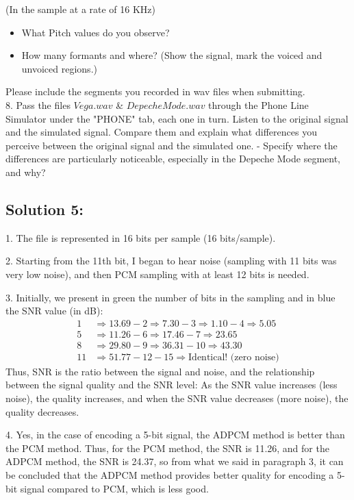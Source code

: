 \documentclass[letterpaper, 12pt]{article}
\begin{document}
   (In the sample at a rate of 16 KHz)\\
   \begin{itemize}
     \item What Pitch values do you observe? \\
     \item How many formants and where? (Show the signal, mark the voiced and unvoiced regions.)
   \end{itemize}
   Please include the segments you recorded in wav files when submitting.\\
8. Pass the files $Vega.wav$ \& $Depeche Mode.wav$ through the Phone Line Simulator under the "PHONE" tab, each one in turn. Listen to the original signal and the simulated signal. Compare them and explain what differences you perceive between the original signal and the simulated one.
   - Specify where the differences are particularly noticeable, especially in the Depeche Mode segment, and why?
\newpage

\subsection*{Solution 5:}
1. The file is represented in 16 bits per sample (16 bits/sample).

2. Starting from the 11th bit, I began to hear noise (sampling with 11 bits was very low noise), and then PCM sampling with at least 12 bits is needed.

3. Initially, we present in green the number of bits in the sampling and in blue the SNR value (in dB):
\begin{align*}
1 &\Rightarrow 13.69 - 2 \Rightarrow 7.30 - 3 \Rightarrow 1.10 - 4 \Rightarrow 5.05 \\
5 &\Rightarrow 11.26 - 6 \Rightarrow 17.46 - 7 \Rightarrow 23.65 \\
8 &\Rightarrow 29.80 - 9 \Rightarrow 36.31 - 10 \Rightarrow 43.30 \\
11 &\Rightarrow 51.77 - 12-15 \Rightarrow \text{Identical! (zero noise)}
\end{align*}
Thus, SNR is the ratio between the signal and noise, and the relationship between the signal quality and the SNR level:
As the SNR value increases (less noise), the quality increases, and when the SNR value decreases (more noise), the quality decreases.

4. Yes, in the case of encoding a 5-bit signal, the ADPCM method is better than the PCM method. Thus, for the PCM method, the SNR is 11.26, and for the ADPCM method, the SNR is 24.37, so from what we said in paragraph 3, it can be concluded that the ADPCM method provides better quality for encoding a 5-bit signal compared to PCM, which is less good.
\end{document}
